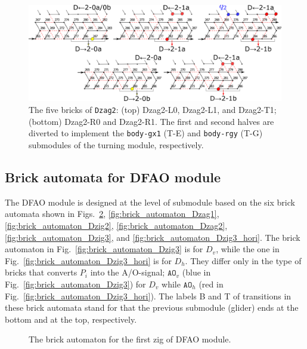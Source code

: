 \documentclass[runningheads]{llncs}
\begin{document}
\begin{figure}[h]
\centering
\includegraphics[width=\linewidth]{Figs/DFAO-zag2.png}  
\caption{The five bricks of \texttt{Dzag2}: (top) Dzag2-L0, Dzag2-L1, and Dzag2-T1; (bottom) Dzag2-R0 and Dzag2-R1. 
The first and second halves are diverted to implement the \texttt{body-gx1} (T-E) and \texttt{body-rgy} (T-G) submodules of the turning module, respectively.}
\label{fig:Dzag2}
\end{figure}



	\subsection{Brick automata for DFAO module}
	\label{ap_subsect:DFAO_module_BA}

The DFAO module is designed at the level of submodule based on the six brick automata shown in Figs.~\ref{fig:brick_automaton_Dzig1}, \ref{fig:brick_automaton_Dzag1}, \ref{fig:brick_automaton_Dzig2}, \ref{fig:brick_automaton_Dzag2}, \ref{fig:brick_automaton_Dzig3}, and \ref{fig:brick_automaton_Dzig3_hori}. 
The brick automaton in Fig.~\ref{fig:brick_automaton_Dzig3} is for $D_v$, while the one in Fig.~\ref{fig:brick_automaton_Dzig3_hori} is for $D_h$. 
They differ only in the type of bricks that converts $P_i$ into the A/O-signal; $\mathtt{AO}_v$ (blue in Fig.~\ref{fig:brick_automaton_Dzig3}) for $D_v$ while $\mathtt{AO}_h$ (red in Fig.~\ref{fig:brick_automaton_Dzig3_hori}). 
The labels B and T of transitions in these brick automata stand for that the previous submodule (glider) ends at the bottom and at the top, respectively. 

\begin{figure}[ht]
\centering
\caption{The brick automaton for the first zig of DFAO module.}
\label{fig:brick_automaton_Dzig1}
\end{figure}
\end{document}

